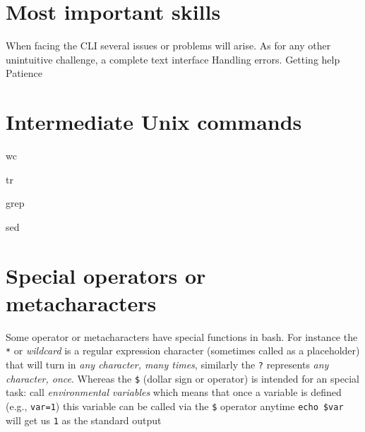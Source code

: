 \documentclass[
  letterpaper,
  DIV=11,
  numbers=noendperiod,
  oneside]{scrreprt}
\newenvironment{Shaded}{\begin{snugshade}}{\end{snugshade}}
\newcommand{\FunctionTok}[1]{\textcolor[rgb]{0.28,0.35,0.67}{#1}}
\begin{document}
\hypertarget{most-important-skills}{%
\section{Most important skills}\label{most-important-skills}}

When facing the CLI several issues or problems will arise. As for any
other unintuitive challenge, a complete text interface Handling errors.
Getting help Patience

\hypertarget{intermediate-unix-commands}{%
\section{Intermediate Unix commands}\label{intermediate-unix-commands}}

\begin{Shaded}
\begin{Highlighting}[]
\FunctionTok{wc}
\end{Highlighting}
\end{Shaded}

\begin{Shaded}
\begin{Highlighting}[]
\FunctionTok{tr}
\end{Highlighting}
\end{Shaded}

\begin{Shaded}
\begin{Highlighting}[]
\FunctionTok{grep} 
\end{Highlighting}
\end{Shaded}

\begin{Shaded}
\begin{Highlighting}[]
\FunctionTok{sed} 
\end{Highlighting}
\end{Shaded}

\hypertarget{special-operators-or-metacharacters}{%
\section{Special operators or
metacharacters}\label{special-operators-or-metacharacters}}

Some operator or metacharacters have special functions in bash. For
instance the \texttt{*} or \emph{wildcard} is a regular expression
character (sometimes called as a placeholder) that will turn in
\emph{any character, many times}, similarly the \texttt{?} represents
\emph{any character, once}. Whereas the \texttt{\$} (dollar sign or
operator) is intended for an special task: call \emph{environmental
variables} which means that once a variable is defined (e.g.,
\texttt{var=1}) this variable can be called via the \texttt{\$} operator
anytime \texttt{echo\ \$var} will get us \texttt{1} as the standard
output
\end{document}
